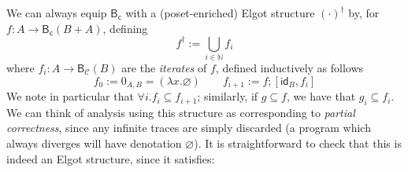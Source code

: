 \documentclass[acmsmall,screen,review]{acmart}
\newcommand{\mc}[1]{\ensuremath{\mathcal{#1}}}
\newcommand{\ms}[1]{\ensuremath{\mathsf{#1}}}
\newcommand{\nats}{\mathbb{N}}
\begin{document}
We can always equip $\ms{B}_{\ms{c}}$ with a (poset-enriched) Elgot structure $(\cdot)^\dagger$ by,
for $f: A \to \ms{B}_{\ms{c}}(B + A)$, defining
\begin{equation*}
  f^\dagger := \bigcup_{i \in \nats}f_i
\end{equation*}
where $f_i : A \to \ms{B}_{\mc{C}}(B)$ are the \emph{iterates} of $f$, defined inductively as
follows
\begin{equation*}
  f_0 := 0_{A, B} = (\lambda x . \varnothing) \qquad
  f_{i + 1} := f ; [\ms{id}_B, f_{i}]
\end{equation*}
We note in particular that $\forall i . f_i \subseteq f_{i + 1}$; similarly, if $g \subseteq f$, we
have that $g_i \subseteq f_i$. We can think of analysis using this structure as corresponding to
\emph{partial correctness}, since any infinite traces are simply discarded (a program which always
diverges will have denotation $\varnothing$). It is straightforward to check that this is indeed an
Elgot structure, since it satisfies:
\end{document}

